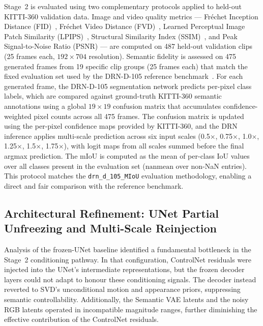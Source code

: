 Stage~2 is evaluated using two complementary protocols applied to held-out KITTI-360 validation data. Image and video quality metrics — Fréchet Inception Distance (FID)~\cite{heusel2017gans}, Fréchet Video Distance (FVD)~\cite{unterthiner2019fvd}, Learned Perceptual Image Patch Similarity (LPIPS)~\cite{zhang2018unreasonable}, Structural Similarity Index (SSIM)~\cite{wang2004image}, and Peak Signal-to-Noise Ratio (PSNR) — are computed on 487 held-out validation clips (25 frames each, $192 \times 704$ resolution). Semantic fidelity is assessed on 475 generated frames from 19 specific clip groups (25 frames each) that match the fixed evaluation set used by the DRN-D-105 reference benchmark~\cite{yu2017dilated}. For each generated frame, the DRN-D-105 segmentation network predicts per-pixel class labels, which are compared against ground-truth KITTI-360 semantic annotations using a global $19 \times 19$ confusion matrix that accumulates confidence-weighted pixel counts across all 475 frames. The confusion matrix is updated using the per-pixel confidence maps provided by KITTI-360, and the DRN inference applies multi-scale prediction across six input scales (0.5$\times$, 0.75$\times$, 1.0$\times$, 1.25$\times$, 1.5$\times$, 1.75$\times$), with logit maps from all scales summed before the final argmax prediction. The mIoU is computed as the mean of per-class IoU values over all classes present in the evaluation set ($\text{nanmean}$ over non-NaN entries). This protocol matches the \texttt{drn\_d\_105\_MIoU} evaluation methodology, enabling a direct and fair comparison with the reference benchmark.

\subsection{Architectural Refinement: UNet Partial Unfreezing and Multi-Scale Reinjection}
\label{subsec:unet_unfreeze}

Analysis of the frozen-UNet baseline identified a fundamental bottleneck in the Stage~2 conditioning pathway. In that configuration, ControlNet residuals were injected into the UNet's intermediate representations, but the frozen decoder layers could not adapt to honour these conditioning signals. The decoder instead reverted to SVD's unconditional motion and appearance priors, suppressing semantic controllability. Additionally, the Semantic VAE latents and the noisy RGB latents operated in incompatible magnitude ranges, further diminishing the effective contribution of the ControlNet residuals.

